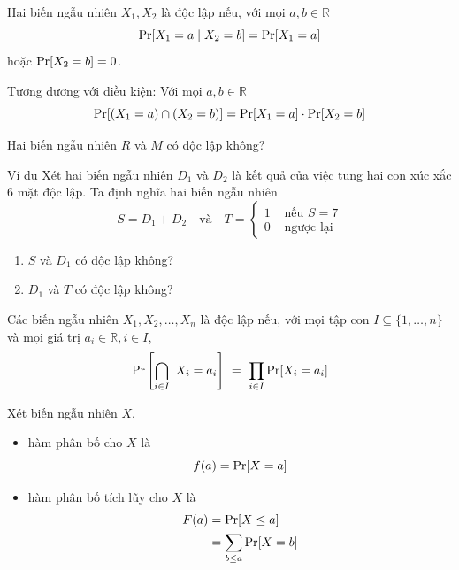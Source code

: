 \begin{frame}
	\begin{dfntn}
		Hai biến ngẫu nhiên $X_1, X_2$ là độc lập nếu, với mọi $a,b \in \mathbb{R}$ 
		\[
			\mathrm{Pr}[X_1 = a \mid X_2 = b] = \mathrm{Pr}[X_1 = a]
		\]
		hoặc $\mathrm{Pr}[X_2 = b] = 0$.
	\end{dfntn}
	Tương đương với điều kiện: Với mọi $a, b \in \mathbb{R}$ 
	\[
		\mathrm{Pr}[(X_1 = a) \cap (X_2 = b)] = \mathrm{Pr}[X_1 = a] \cdot \mathrm{Pr}[X_2 = b]   
	\]
\end{frame}

\begin{frame}
	\begin{qstn}
		Hai biến ngẫu nhiên $R$ và $M$ có độc lập không?
	\end{qstn} 
\end{frame}

\begin{frame}{Ví dụ}
	Xét hai biến ngẫu nhiên   $D_1$ và $D_2$ là kết quả của việc tung hai con xúc xắc $6$ mặt độc lập. Ta định nghĩa hai biến ngẫu nhiên
	\[
		S = D_1 + D_2\quad \text{và}\quad T= \begin{cases}
			1 & \text{ nếu } S = 7\\
			0 & \text{ ngược lại }
		\end{cases}
	\]
	\begin{qstn}
		\begin{enumerate}
			\item 		$S$ và $D_1$ có độc lập không?    

			\item $D_1$ và $T$ có độc lập không? 
		\end{enumerate}
	\end{qstn}
\end{frame}

\begin{frame}
	\begin{dfntn}
		Các biến ngẫu nhiên $X_1,X_2, \dots, X_n$ là độc lập nếu, với mọi tập con $I \subseteq \{1,\dots,n\}$ và mọi giá trị $a_i \in \mathbb{R}, i \in I$,
		\[
			\mathrm{Pr}\left[\bigcap_{i\in I}\ X_i = a_i \right]\ = \ \prod_{i \in I} \mathrm{Pr}[X_i = a_i]
		\] 
	\end{dfntn}
\end{frame}

\begin{frame}
	\begin{dfntn}
		Xét biến ngẫu nhiên $X$, 
		\begin{itemize}
			\item hàm phân bố   cho $X$ là 
		\[
			f(a) = \mathrm{Pr}[X = a]
		\]
		
		\item hàm phân bố   tích lũy cho $X$ là  
		\begin{align*}
				F(a) &= \mathrm{Pr}[X \leq a]\\
				     &= \sum_{b \leq a} \mathrm{Pr}[X = b] 
		\end{align*}
			
		\end{itemize}
	\end{dfntn}
\end{frame}


